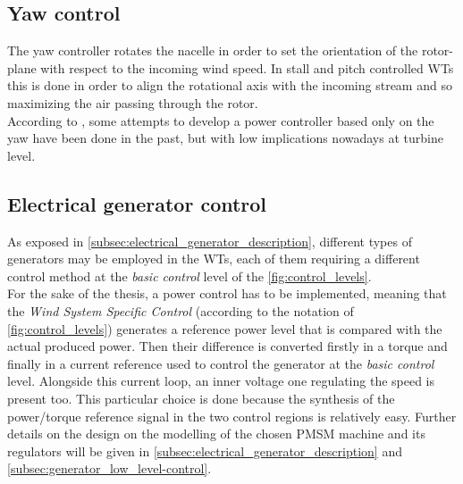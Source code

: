 \subsection{Yaw control}
The yaw controller rotates the nacelle in order to set the orientation of the rotor-plane with respect to the incoming wind speed. In stall and pitch controlled \acrshort{WTs} this is done in order to align the rotational axis with the incoming stream and so maximizing the air passing through the rotor. \\
According to \cite{Aerodynamics_of_wind_turbines}, some attempts to develop a power controller based only on the yaw have been done in the past, but with low implications nowadays at turbine level. 

\subsection{Electrical generator control}
As exposed in \autoref{subsec:electrical_generator_description}, different types of generators may be employed in the WTs, each of them requiring a different control method at the \textit{basic control} level of the \autoref{fig:control_levels}. \\
For the sake of the thesis, a power control has to be implemented, meaning that the \textit{Wind System Specific Control} (according to the notation of \autoref{fig:control_levels}) generates a reference power level that is compared with the actual produced power. Then their difference is converted firstly in a torque and finally in a current reference used to control the generator at the \textit{basic control} level. Alongside this current loop, an inner voltage one regulating the speed is present too. This particular choice is done because the synthesis of the power/torque reference signal in the two control regions is relatively easy. Further details on the design on the modelling of the chosen PMSM machine and its regulators will be given in \autoref{subsec:electrical_generator_description} and \autoref{subsec:generator_low_level-control}.